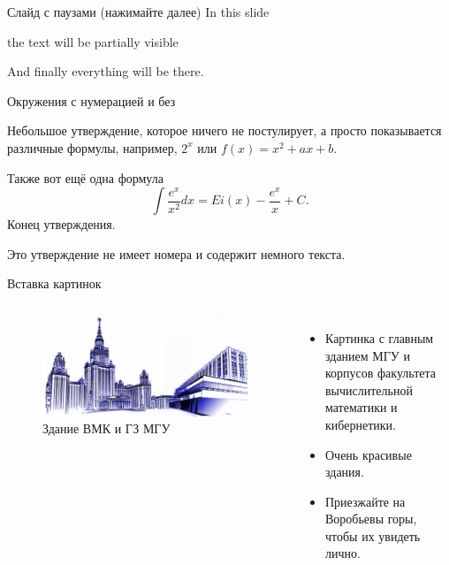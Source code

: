 \documentclass{../cmcbeamer}
\begin{document}
\begin{frame}{Слайд с паузами (нажимайте далее)}
 In this slide \pause%

 the text will be partially visible \pause%

 And finally everything will be there.
\end{frame}

\begin{frame}{Окружения с нумерацией и без}
  \begin{proposition}\label{prop:example:test}
    Небольшое утверждение, которое ничего не постулирует, а просто
    показывается различные формулы, например, \(2^{x}\) или
    \(f(x)=x^{2}+ax+ b\).

    Также вот ещё одна формула
    \[
      \int\frac{e^{x}}{x^{2}}dx=Ei(x)-\frac{e^{x}}{x}+C.
    \]
    Конец утверждения.
  \end{proposition}

  \begin{proposition*}
    Это утверждение не имеет номера и содержит немного текста.
  \end{proposition*}
\end{frame}

\begin{frame}{Вставка картинок}
  \begin{columns}
    \begin{figure}[H]
      \centering
      \includegraphics[scale=0.2]{images/msu-cmc-logo.png}
      \caption{Здание ВМК и ГЗ МГУ}\label{fig:example:cmc-gz}
    \end{figure}

    \begin{itemize}
    \item Картинка с главным зданием МГУ и корпусов факультета
      вычислительной математики и кибернетики.
    \item Очень красивые здания.
    \item Приезжайте на Воробьевы горы, чтобы их увидеть лично.
    \end{itemize}
    
  \end{columns}
\end{frame}
\end{document}
